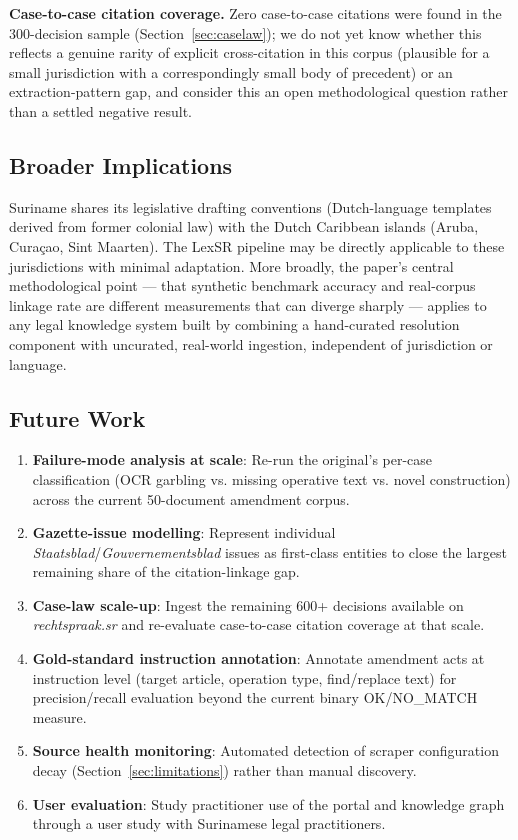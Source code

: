 \documentclass{IOS-Book-Article}
\begin{document}
\textbf{Case-to-case citation coverage.} Zero case-to-case citations were found in the 300-decision
sample (Section~\ref{sec:caselaw}); we do not yet know whether this reflects a genuine rarity of explicit
cross-citation in this corpus (plausible for a small jurisdiction with a correspondingly
small body of precedent) or an extraction-pattern gap, and consider this an open
methodological question rather than a settled negative result.

\subsection{Broader Implications}

Suriname shares its legislative drafting conventions (Dutch-language templates derived from
former colonial law) with the Dutch Caribbean islands (Aruba, Cura\c{c}ao, Sint Maarten). The
LexSR pipeline may be directly applicable to these jurisdictions with minimal adaptation.
More broadly, the paper's central methodological point --- that synthetic benchmark accuracy
and real-corpus linkage rate are different measurements that can diverge sharply --- applies
to any legal knowledge system built by combining a hand-curated resolution component with
uncurated, real-world ingestion, independent of jurisdiction or language.

\subsection{Future Work}
\label{sec:future}

\begin{enumerate}
\item \textbf{Failure-mode analysis at scale}: Re-run the original's per-case classification
   (OCR garbling vs. missing operative text vs. novel construction) across the current
   50-document amendment corpus.
\item \textbf{Gazette-issue modelling}: Represent individual \emph{Staatsblad}/\emph{Gouvernementsblad} issues
   as first-class entities to close the largest remaining share of the citation-linkage gap.
\item \textbf{Case-law scale-up}: Ingest the remaining 600+ decisions available on \emph{rechtspraak.sr}
   and re-evaluate case-to-case citation coverage at that scale.
\item \textbf{Gold-standard instruction annotation}: Annotate amendment acts at instruction level
   (target article, operation type, find/replace text) for precision/recall evaluation
   beyond the current binary OK/NO\_MATCH measure.
\item \textbf{Source health monitoring}: Automated detection of scraper configuration decay
   (Section~\ref{sec:limitations}) rather than manual discovery.
\item \textbf{User evaluation}: Study practitioner use of the portal and knowledge graph through a
   user study with Surinamese legal practitioners.
\end{enumerate}
\end{document}

